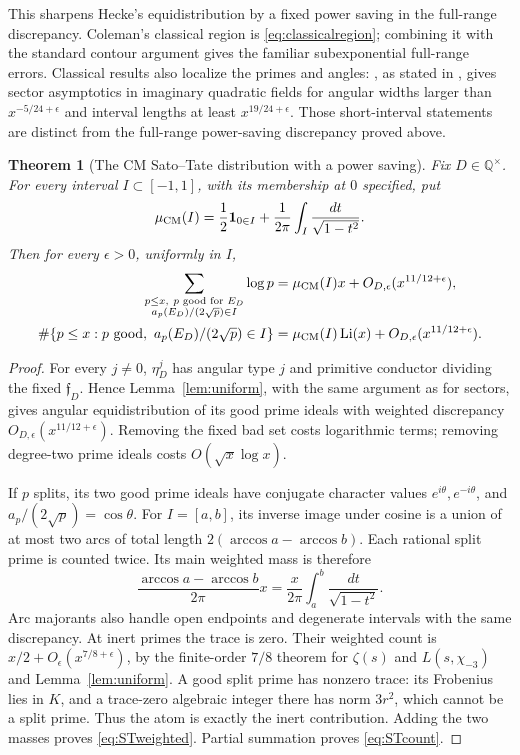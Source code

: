 \documentclass[11pt,a4paper]{article}
\numberwithin{equation}{section}
\newtheorem{theorem}{Theorem}[section]
\theoremstyle{definition}
\theoremstyle{remark}
\newcommand{\Q}{\mathbb Q}
\newcommand{\ind}{\mathbf 1}
\begin{document}
This sharpens Hecke's equidistribution by a fixed power saving in the full-range discrepancy. Coleman's classical region is \eqref{eq:classicalregion}; combining it with the standard contour argument gives the familiar subexponential full-range errors. Classical results also localize the primes and angles: \cite{ColemanPrimes}, as stated in \cite[Introduction]{Khale}, gives sector asymptotics in imaginary quadratic fields for angular widths larger than $x^{-5/24+\epsilon}$ and interval lengths at least $x^{19/24+\epsilon}$. Those short-interval statements are distinct from the full-range power-saving discrepancy proved above.

\begin{theorem}[The CM Sato--Tate distribution with a power saving]\label{thm:ST}
Fix $D\in\Q^\times$. For every interval $I\subset[-1,1]$, with its membership at $0$ specified, put
\[
 \mu_{\rm CM}(I)=\frac12\ind_{0\in I}+\frac1{2\pi}\int_I\frac{dt}{\sqrt{1-t^2}}.
\]
Then for every $\epsilon>0$, uniformly in $I$,
\begin{align}\label{eq:STweighted}
 \sum_{\substack{p\le x,\ p\text{ good for }E_D\\a_p(E_D)/(2\sqrt p)\in I}}\log p
 &=\mu_{\rm CM}(I)x+O_{D,\epsilon}(x^{11/12+\epsilon}),\\
 \#\{p\le x:p\text{ good},\ a_p(E_D)/(2\sqrt p)\in I\}
 &=\mu_{\rm CM}(I)\operatorname{Li}(x)+O_{D,\epsilon}(x^{11/12+\epsilon}).\label{eq:STcount}
\end{align}
\end{theorem}
\begin{proof}
For every $j\ne0$, $\eta_D^j$ has angular type $j$ and primitive conductor dividing the fixed $\mathfrak f_D$. Hence Lemma~\ref{lem:uniform}, with the same argument as for sectors, gives angular equidistribution of its good prime ideals with weighted discrepancy $O_{D,\epsilon}(x^{11/12+\epsilon})$. Removing the fixed bad set costs logarithmic terms; removing degree-two prime ideals costs $O(\sqrt x\log x)$.

If $p$ splits, its two good prime ideals have conjugate character values $e^{i\theta},e^{-i\theta}$, and $a_p/(2\sqrt p)=\cos\theta$. For $I=[a,b]$, its inverse image under cosine is a union of at most two arcs of total length $2(\arccos a-\arccos b)$. Each rational split prime is counted twice. Its main weighted mass is therefore
\[
 \frac{\arccos a-\arccos b}{2\pi}x
 =\frac x{2\pi}\int_a^b\frac{dt}{\sqrt{1-t^2}}.
\]
Arc majorants also handle open endpoints and degenerate intervals with the same discrepancy. At inert primes the trace is zero. Their weighted count is $x/2+O_\epsilon(x^{7/8+\epsilon})$, by the finite-order $7/8$ theorem for $\zeta(s)$ and $L(s,\chi_{-3})$ and Lemma~\ref{lem:uniform}. A good split prime has nonzero trace: its Frobenius lies in $K$, and a trace-zero algebraic integer there has norm $3r^2$, which cannot be a split prime. Thus the atom is exactly the inert contribution. Adding the two masses proves \eqref{eq:STweighted}. Partial summation proves \eqref{eq:STcount}.
\end{proof}
\end{document}
